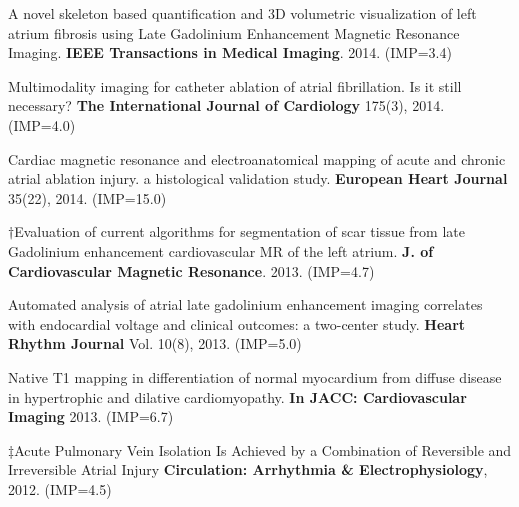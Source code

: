 \documentclass[letterpaper]{twentysecondcv} %
\begin{document}
\begin{etaremune}
\item A novel skeleton based quantification and 3D volumetric visualization of left atrium fibrosis using Late Gadolinium Enhancement Magnetic Resonance Imaging. \textbf{IEEE Transactions in Medical Imaging}. 2014. (IMP=3.4)
\item Multimodality imaging for catheter ablation of atrial fibrillation. Is it still necessary? \textbf{The International Journal of Cardiology} 175(3), 2014. (IMP=4.0)
\item Cardiac magnetic resonance and electroanatomical mapping of acute and chronic atrial ablation injury. a histological validation study. \textbf{European Heart Journal} 35(22), 2014. (IMP=15.0)
\item  $\dagger$Evaluation of current algorithms for segmentation of scar tissue from late Gadolinium enhancement cardiovascular MR of the left atrium. \textbf{J. of Cardiovascular Magnetic Resonance}. 2013. (IMP=4.7)
\item Automated analysis of atrial late gadolinium enhancement imaging correlates with endocardial voltage and clinical outcomes: a two-center study. \textbf{Heart Rhythm Journal} Vol. 10(8), 2013. (IMP=5.0)
\item Native T1 mapping in differentiation of normal myocardium from diffuse disease in hypertrophic and dilative cardiomyopathy. \textbf{In JACC: Cardiovascular Imaging} 2013. (IMP=6.7)
\item $\ddagger$Acute Pulmonary Vein Isolation Is Achieved by a Combination of Reversible and Irreversible Atrial Injury \textbf{Circulation: Arrhythmia \& Electrophysiology}, 2012. (IMP=4.5)

\end{etaremune}
\renewcommand{\theenumi}{C\arabic{enumi}}
\end{document}
